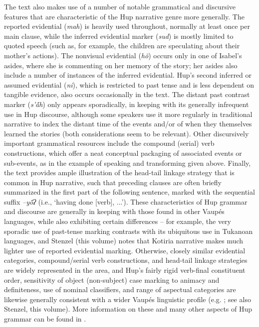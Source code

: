 \documentclass[output=paper,
modfonts,nonflat
]{langsci/langscibook}
\begin{document}
	The text also makes use of a number of notable grammatical and discursive features that are characteristic of the Hup narrative genre more generally. The reported evidential (\textit{mah}) is heavily used throughout, normally at least once per main clause, while the inferred evidential marker (\textit{sud}) is mostly limited to quoted speech (such as, for example, the children are speculating about their mother’s actions). The nonvisual evidential (\textit{hõ}) occurs only in one of Isabel’s asides, where she is commenting on her memory of the story; her asides also include a number of instances of the inferred evidential. Hup’s second inferred or assumed evidential (\textit{ni}), which is restricted to past tense and is less dependent on tangible evidence, also occurs occasionally in the text. The distant past contrast marker (\textit{s'ã́h}) only appears sporadically, in keeping with its generally infrequent use in Hup discourse, although some speakers use it more regularly in traditional narrative to index the distant time of the events and/or of when they themselves learned the stories (both considerations seem to be relevant). Other discursively important grammatical resources include the compound (serial) verb constructions, which offer a neat conceptual packaging of associated events or sub-events, as in the example of speaking and transforming given above. Finally, the text provides ample illustration of the head-tail linkage strategy that is common in Hup narrative, such that preceding clauses are often briefly summarized in the first part of the following sentence, marked with the sequential suffix \textit{–yö́ʔ} (i.e., ‘having done [verb], ...’). These characteristics of Hup grammar and discourse are generally in keeping with those found in other Vaupés languages, while also exhibiting certain differences – for example, the very sporadic use of past-tense marking contrasts with its ubiquitous use in Tukanoan languages, and Stenzel (this volume) notes that Kotiria narrative makes much lighter use of reported evidential marking. Otherwise, closely similar evidential categories, compound/serial verb constructions, and head-tail linkage strategies are widely represented in the area, and Hup’s fairly rigid verb-final constituent order, sensitivity of object (non-subject) case marking to animacy and definiteness, use of nominal classifiers, and range of aspectual categories are likewise generally consistent with a wider Vaupés linguistic profile (e.g. \citealt{Gomez-Imbert1996,Aikhenvald2002,Epps2007,Stenzel2013}; see also Stenzel, this volume). More information on these and many other aspects of Hup grammar can be found in \citet{Epps2008}.
    
\end{document}
